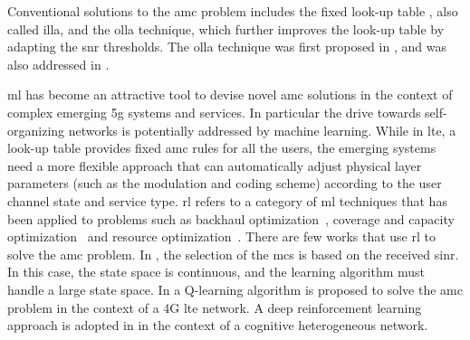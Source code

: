 Conventional solutions to the \gls{amc} problem includes the fixed look-up table \cite{fantacci2009adaptive}, also called \gls{illa}, and the \gls{olla} technique, which further improves the look-up table by adapting the \gls{snr} thresholds.
%
The \gls{olla} technique was first proposed in \cite{Sampath1997}, and was also addressed in \cite{Pedersen2007,Sarret2015, Blanquez-Casado2016}.

\Gls{ml} has become an attractive tool to devise novel \gls{amc} solutions in the context of complex emerging \gls{5g} systems and services.
%
In particular the drive towards self-organizing networks is potentially addressed by machine learning.
%
While in \gls{lte}, a look-up table provides fixed \gls{amc} rules for all the users, the emerging systems need a more flexible approach that can automatically adjust physical layer parameters (such as the modulation and coding scheme) according to the user channel state and service type.
%
\Gls{rl} refers to a category of \gls{ml} techniques \cite{survey-son} that has been applied to problems such as backhaul optimization~\cite{jaber2015}, coverage and capacity optimization~\cite{Fan2014} and resource optimization~\cite{Miozzo2017SwitchOnOffPF}.
%
There are few works that use \gls{rl} to solve the \gls{amc} problem.
%
In \cite{continuousState}, the selection of the \gls{mcs} is based on the received \gls{sinr}.
%
In this case, the state space is continuous, and the learning algorithm must handle a large state space.
%
In \cite{bruno2014robust} a Q-learning algorithm is proposed to solve the \gls{amc} problem in the context of a 4G \gls{lte} network.
%
A deep reinforcement learning approach is adopted in \cite{DRL_AMC} in the context of a cognitive heterogeneous network.
%


